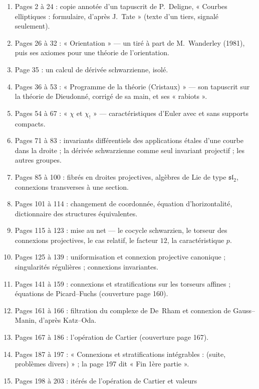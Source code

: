 \documentclass[11pt,a4paper]{article}
\begin{document}
\begin{enumerate}
  \item[I.] Pages 2 à 24 : copie annotée d'un tapuscrit de P.~Deligne,
  « Courbes elliptiques : formulaire, d'après J.~Tate » (texte d'un tiers,
  signalé seulement).
  \item[II.] Pages 26 à 32 : « Orientation » — un tiré à part de M.~Wanderley
  (1981), puis ses axiomes pour une théorie de l'orientation.
  \item[III.] Page 35 : un calcul de dérivée schwarzienne, isolé.
  \item[IV.] Pages 36 à 53 : « Programme de la théorie (Cristaux) » — son
  tapuscrit sur la théorie de Dieudonné, corrigé de sa main, et ses
  « rabiots ».
  \item[V.] Pages 54 à 67 : « $\chi$ et $\chi_!$ » — caractéristiques d'Euler
  avec et sans supports compacts.
  \item[VI.] Pages 71 à 83 : invariants différentiels des applications
  étales d'une courbe dans la droite ; la dérivée schwarzienne comme seul
  invariant projectif ; les autres groupes.
  \item[VII.] Pages 85 à 100 : fibrés en droites projectives, algèbres de Lie
  de type $\mathfrak{sl}_2$, connexions transverses à une section.
  \item[VIII.] Pages 101 à 114 : changement de coordonnée, équation
  d'horizontalité, dictionnaire des structures équivalentes.
  \item[IX.] Pages 115 à 123 : mise au net — le cocycle schwarzien, le
  torseur des connexions projectives, le cas relatif, le facteur $12$, la
  caractéristique $p$.
  \item[X.] Pages 125 à 139 : uniformisation et connexion projective
  canonique ; singularités régulières ; connexions invariantes.
  \item[XI.] Pages 141 à 159 : connexions et stratifications sur les torseurs
  affines ; équations de Picard--Fuchs (couverture page 160).
  \item[XII.] Pages 161 à 166 : filtration du complexe de De~Rham et connexion
  de Gauss--Manin, d'après Katz--Oda.
  \item[XIII.] Pages 167 à 186 : l'opération de Cartier (couverture page 167).
  \item[XIV.] Pages 187 à 197 : « Connexions et stratifications intégrables :
  (suite, problèmes divers) » ; la page 197 dit « Fin 1ère partie ».
  \item[XV.] Pages 198 à 203 : itérés de l'opération de Cartier et valeurs

\end{enumerate}
\end{document}
